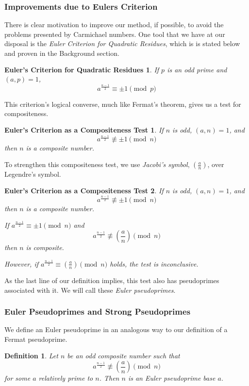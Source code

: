 \documentclass{article}
\newtheorem*{definition}{Definition}
\begin{document}
\subsubsection{Improvements due to Eulers Criterion}

There is clear motivation to improve our method, if possible, to avoid the problems presented by Carmichael numbers. One tool that we have at our disposal is the \textit{Euler Criterion for Quadratic Residues}, which is is stated below and proven in the Background %
section.

\newtheorem*{eulercriterion}{Euler's Criterion for Quadratic Residues}
\newtheorem*{eulerconverse}{Euler's Criterion as a Compositeness Test}

\begin{eulercriterion}
If $p$ is an odd prime and $(a,p) = 1$, 
$$a^{\frac{n-1}{2}} \equiv \pm 1 \pmod p$$
\end{eulercriterion}


This criterion's logical converse, much like Fermat's theorem, gives us a test for compositeness.
\begin{eulerconverse}
If $n$ is odd, $(a,n) = 1$, and
	$$a^{\frac{n-1}{2}} \not\equiv \pm 1 \pmod n$$
	then $n$ is a composite number.
\end{eulerconverse}

To strengthen this compositeness test, we use \textit{Jacobi's symbol}, $( \frac{a}{n})$, over Legendre's symbol.

\begin{eulerconverse}
If $n$ is odd, $(a,n) = 1$, and
	$$a^{\frac{n-1}{2}} \not\equiv \pm 1 \pmod n$$
	then $n$ is a composite number.
	
\par If $a^{\frac{n-1}{2}} \equiv \pm 1 \pmod n$ and
	$$a^{\frac{n-1}{2}} \not\equiv (\frac{a}{n}) \pmod n$$
	then $n$ is composite.
	
\par However, if $a^{\frac{n-1}{2}} \equiv (\frac{a}{n}) \pmod n$ holds, the test is inconclusive.
\end{eulerconverse}

As the last line of our definition implies, this test also has pseudoprimes associated with it. We will call these \textit{Euler pseudoprimes}.
\subsubsection{Euler Pseudoprimes and Strong Pseudoprimes}
We define an Euler pseudoprime in an analogous way to our definition of a Fermat pseudoprime.
\begin{definition}
Let $n$ be an odd composite number such that
	 $$a^{\frac{n-1}{2}} \not\equiv (\frac{a}{n}) \pmod n$$ 
for some $a$ relatively prime to $n$.  Then $n$ is an \textit{Euler pseudoprime} base $a$.
\end{definition}
\end{document}
